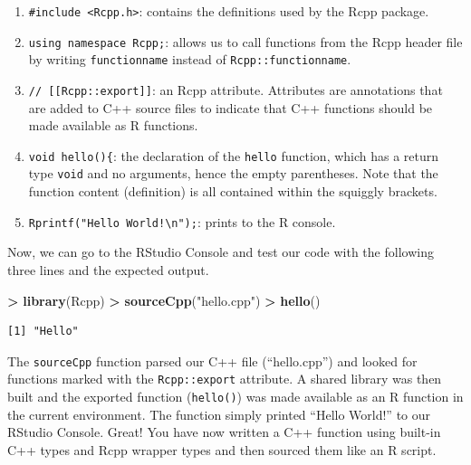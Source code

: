\documentclass[]{krantz}
\makeatletter
\newenvironment{Shaded}{\begin{snugshade}}{\end{snugshade}}
\newcommand{\KeywordTok}[1]{\textcolor[rgb]{0.27,0.27,0.27}{\textbf{#1}}}
\newcommand{\NormalTok}[1]{#1}
\newcommand{\OperatorTok}[1]{\textcolor[rgb]{0.43,0.43,0.43}{\textbf{#1}}}
\newcommand{\StringTok}[1]{\textcolor[rgb]{0.5,0.5,0.5}{#1}}
\providecommand{\tightlist}{%
  \setlength{\itemsep}{0pt}\setlength{\parskip}{0pt}}
\newenvironment{kframe}{%
\medskip{}
\setlength{\fboxsep}{.8em}
 \def\at@end@of@kframe{}%
 \ifinner\ifhmode%
  \def\at@end@of@kframe{\end{minipage}}%
  \begin{minipage}{\columnwidth}%
 \fi\fi%
 \def\FrameCommand##1{\hskip\@totalleftmargin \hskip-\fboxsep
 \colorbox{shadecolor}{##1}\hskip-\fboxsep
     \hskip-\linewidth \hskip-\@totalleftmargin \hskip\columnwidth}%
 \MakeFramed {\advance\hsize-\width
   \@totalleftmargin\z@ \linewidth\hsize
   \@setminipage}}%
 {\par\unskip\endMakeFramed%
 \at@end@of@kframe}
\renewenvironment{Shaded}{\begin{kframe}}{\end{kframe}}
\makeatother
\begin{document}
\begin{enumerate}
\def\labelenumi{\arabic{enumi}.}
\tightlist
\item
  \texttt{\#include\ \textless{}Rcpp.h\textgreater{}}: contains the definitions used by the Rcpp package.

  \item

  \texttt{using\ namespace\ Rcpp;}: allows us to call functions from the Rcpp header file by writing \texttt{functionname} instead of \texttt{Rcpp::functionname}.

  \item

  \texttt{//\ {[}{[}Rcpp::export{]}{]}}: an Rcpp attribute. Attributes are annotations that are added to C++ source files to indicate that C++ functions should be made available as R functions.

  \item

  \texttt{void\ hello()\{}: the declaration of the \texttt{hello} function, which has a return type \texttt{void} and no arguments, hence the empty parentheses. Note that the function content (definition) is all contained within the squiggly brackets.

  \item

  \texttt{Rprintf("Hello\ World!\textbackslash{}n");}: prints to the R console.
\end{enumerate}

Now, we can go to the RStudio Console and test our code with the following three lines and the expected output.

\begin{Shaded}
\begin{Highlighting}[]
\OperatorTok{>}\StringTok{ }\KeywordTok{library}\NormalTok{(Rcpp)}
\OperatorTok{>}\StringTok{ }\KeywordTok{sourceCpp}\NormalTok{(}\StringTok{"hello.cpp"}\NormalTok{)}
\OperatorTok{>}\StringTok{ }\KeywordTok{hello}\NormalTok{()}
\end{Highlighting}
\end{Shaded}

\begin{verbatim}
[1] "Hello"
\end{verbatim}

The \texttt{sourceCpp} function parsed our C++ file (``hello.cpp'') and looked for functions marked with the \texttt{Rcpp::export} attribute. A shared library was then built and the exported function (\texttt{hello()}) was made available as an R function in the current environment. The function simply printed ``Hello World!'' to our RStudio Console. Great! You have now written a C++ function using built-in C++ types and Rcpp wrapper types and then sourced them like an R script.
\end{document}
